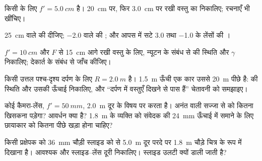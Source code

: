 \begin{exercise}[$\star$]\label{exo:b1:mirrors-thin-lenses:2}
किसी  के लिए $f' = \qty{5.0}{cm}$ है। \qty{20}{cm} पर, फिर
\qty{3.0}{cm} पर रखी वस्तु का  निकालिए; रचनाएँ भी खींचिए।
\end{exercise}

\begin{exercise}[$\star$]\label{exo:b1:mirrors-thin-lenses:3}
\qty{25}{cm}  वाले  की  दीजिए; \qty{-2.0}{\delta} वाले
 की ; और आपस में सटे \qty{+3.0}{\delta} तथा
\qty{-1.0}{\delta} के लेंसों की ।
\end{exercise}

\begin{exercise}[$\star$]\label{exo:b1:mirrors-thin-lenses:4}
$f' = \qty{10}{cm}$ और $F$ से \qty{15}{cm} आगे रखी वस्तु के लिए,
न्यूटन के संबंध से  की स्थिति और $\gamma$ निकालिए; देकार्त के संबंध
से जाँच कीजिए।
\end{exercise}

\begin{exercise}[$\star\star$]\label{exo:b1:mirrors-thin-lenses:5}
किसी उत्तल पश्च-दृश्य दर्पण के लिए $R = \qty{2.0}{m}$ है। \qty{1.5}{m}
ऊँची एक कार उससे \qty{20}{m} पीछे है:  की स्थिति और उसकी ऊँचाई
निकालिए, और ``दर्पण में वस्तुएँ दिखने से पास हैं'' चेतावनी को समझाइए।
\end{exercise}

\begin{exercise}[$\star\star$]\label{exo:b1:mirrors-thin-lenses:6}
कोई कैमरा-लेंस, $f' = \qty{50}{mm}$, \qty{2.0}{m} दूर के विषय पर 
करता है। अनंत वाली सज्जा से  को कितना खिसकना पड़ेगा? आवर्धन क्या है?
\qty{1.8}{m} के व्यक्ति को संवेदक की \qty{24}{mm} ऊँचाई में समाने के लिए
छायाकार को कितना पीछे खड़ा होना चाहिए?
\end{exercise}

\begin{exercise}[$\star\star$]\label{exo:b1:mirrors-thin-lenses:7}
किसी प्रक्षेपक को \qty{36}{mm} चौड़ी स्लाइड को  से \qty{5.0}{m} दूर परदे
पर \qty{1.8}{m} चौड़े चित्र के रूप में दिखाना है। आवश्यक  और
स्लाइड--लेंस दूरी निकालिए। स्लाइड उलटी क्यों डाली जाती है?
\end{exercise}

